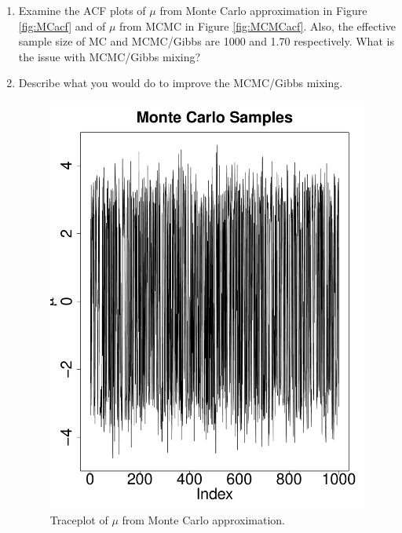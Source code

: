 \documentclass[11pt]{article}
\begin{document}
\begin{enumerate}
\begin{enumerate}
\item Examine the ACF plots of $\mu$ from Monte Carlo approximation in Figure \ref{fig:MCacf} and of $\mu$ from MCMC in Figure \ref{fig:MCMCacf}. Also, the effective sample size of MC and MCMC/Gibbs are 1000 and 1.70 respectively. What is the issue with MCMC/Gibbs mixing?

\item Describe what you would do to improve the MCMC/Gibbs mixing.

\newpage
\begin{multicols}{2}
\begin{figure}[H]
\begin{center}
\includegraphics[scale=0.3]{figures/MCtrace}
\caption{\label{fig:MCtrace} Traceplot of $\mu$ from Monte Carlo approximation.}
\end{center}
\end{figure}


\end{multicols}
\end{enumerate}
\end{enumerate}
\end{document}
